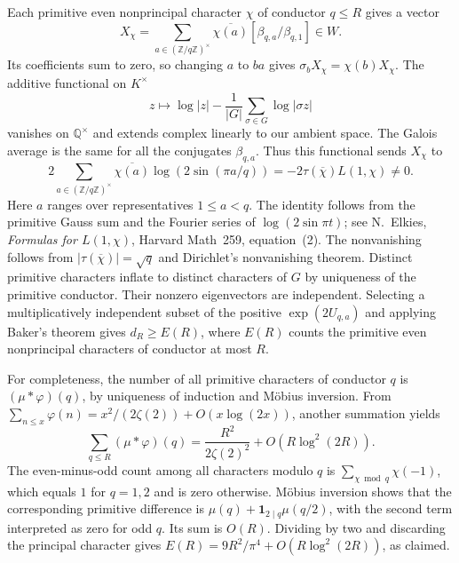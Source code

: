 \documentclass[11pt,a4paper,oneside,openany]{report}
\theoremstyle{remark}\newtheorem{remark}[theorem]{Remark}
\numberwithin{equation}{section}
\begin{document}
Each primitive even nonprincipal character $\chi$ of conductor $q\le R$
gives a vector
\[
 X_\chi=\sum_{a\in(\mathbb Z/q\mathbb Z)^\times}\overline{\chi(a)}
              [\beta_{q,a}/\beta_{q,1}]\in W.
\]
Its coefficients sum to zero, so changing $a$ to $ba$ gives
$\sigma_b X_\chi=\chi(b)X_\chi$. The additive functional on $K^\times$
\[
 z\longmapsto\log|z|-\frac{1}{|G|}\sum_{\sigma\in G}\log|\sigma z|
\]
vanishes on $\mathbb Q^\times$ and extends complex linearly to our
ambient space. The Galois average is the same for all the conjugates
$\beta_{q,a}$. Thus this functional sends $X_\chi$ to
\[
 2\sum_{a\in(\mathbb Z/q\mathbb Z)^\times}\overline{\chi(a)}
       \log(2\sin(\pi a/q))
   =-2\tau(\overline\chi)L(1,\chi)\ne0.
\]
Here $a$ ranges over representatives $1\le a<q$.
The identity follows from the primitive Gauss sum and the Fourier
series of $\log(2\sin\pi t)$; see N.~Elkies, \emph{Formulas for
$L(1,\chi)$}, Harvard Math~259, equation~(2).
The nonvanishing follows from $|\tau(\overline\chi)|=\sqrt q$ and
Dirichlet's nonvanishing theorem. Distinct primitive characters inflate
to distinct characters of $G$ by uniqueness of the primitive conductor.
Their nonzero eigenvectors are independent. Selecting a multiplicatively
independent subset of the positive $\exp(2U_{q,a})$ and applying Baker's
theorem gives $d_R\ge E(R)$, where $E(R)$ counts the primitive even
nonprincipal characters of conductor at most $R$.

For completeness, the number of all primitive characters of conductor
$q$ is $(\mu*\varphi)(q)$, by uniqueness of induction and M\"obius
inversion. From $\sum_{n\le x}\varphi(n)=x^2/(2\zeta(2))+O(x\log(2x))$,
another summation yields
\[
 \sum_{q\le R}(\mu*\varphi)(q)
  =\frac{R^2}{2\zeta(2)^2}+O(R\log^2(2R)).
\]
The even-minus-odd count among all characters modulo $q$ is
$\sum_{\chi\bmod q}\chi(-1)$, which equals $1$ for $q=1,2$ and is zero
otherwise. M\"obius inversion shows that the corresponding primitive
difference is $\mu(q)+\mathbf 1_{2\mid q}\mu(q/2)$, with the second term
interpreted as zero for odd $q$. Its sum is $O(R)$. Dividing by two and
discarding the principal character gives
$E(R)=9R^2/\pi^4+O(R\log^2(2R))$, as claimed.
\end{document}

